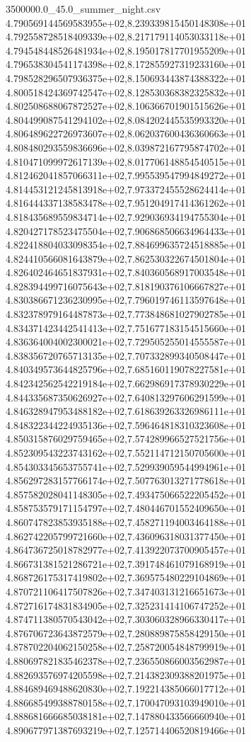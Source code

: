 \begin{filecontents*}{3500000.0_45.0_summer_night.csv}
4.790569144569583955e+02,8.239339815450148308e+01
4.792558728518409339e+02,8.217179114053033118e+01
4.794548448526481934e+02,8.195017817701955209e+01
4.796538304541174398e+02,8.172855927319233160e+01
4.798528296507936375e+02,8.150693443874388322e+01
4.800518424369742547e+02,8.128530368382325832e+01
4.802508688067872527e+02,8.106366701901515626e+01
4.804499087541294102e+02,8.084202445535993320e+01
4.806489622726973607e+02,8.062037600436360663e+01
4.808480293559836696e+02,8.039872167795874702e+01
4.810471099972617139e+02,8.017706148854540515e+01
4.812462041857066311e+02,7.995539547994849272e+01
4.814453121245813918e+02,7.973372455528624414e+01
4.816444337138583478e+02,7.951204917414361262e+01
4.818435689559834714e+02,7.929036934194755304e+01
4.820427178523475504e+02,7.906868506634964433e+01
4.822418804033098354e+02,7.884699635724518885e+01
4.824410566081643879e+02,7.862530322674501804e+01
4.826402464651837931e+02,7.840360568917003548e+01
4.828394499716075643e+02,7.818190376106667827e+01
4.830386671236230995e+02,7.796019746113597648e+01
4.832378979164487873e+02,7.773848681027902785e+01
4.834371423442541413e+02,7.751677183154515660e+01
4.836364004002300021e+02,7.729505255014555587e+01
4.838356720765713135e+02,7.707332899340508447e+01
4.840349573644825796e+02,7.685160119078227581e+01
4.842342562542219184e+02,7.662986917378930229e+01
4.844335687350626927e+02,7.640813297606291599e+01
4.846328947953488182e+02,7.618639263326986111e+01
4.848322344224935136e+02,7.596464818310323608e+01
4.850315876029759465e+02,7.574289966527521756e+01
4.852309543223743162e+02,7.552114712150705600e+01
4.854303345653755741e+02,7.529939059544994961e+01
4.856297283157766174e+02,7.507763013271778618e+01
4.857582028041148305e+02,7.493475066522205452e+01
4.858753579171154797e+02,7.480446701552409650e+01
4.860747823853935188e+02,7.458271194003464188e+01
4.862742205799721660e+02,7.436096318031377450e+01
4.864736725018782977e+02,7.413922073700905457e+01
4.866731381521286721e+02,7.391748461079168919e+01
4.868726175317419802e+02,7.369575480229104869e+01
4.870721106417507826e+02,7.347403131216651673e+01
4.872716174831834905e+02,7.325231414106747252e+01
4.874711380570543042e+02,7.303060328966330417e+01
4.876706723643872579e+02,7.280889875858429150e+01
4.878702204062150258e+02,7.258720054848799919e+01
4.880697821835462378e+02,7.236550866003562987e+01
4.882693576974205598e+02,7.214382309388201975e+01
4.884689469488620830e+02,7.192214385066017712e+01
4.886685499388780158e+02,7.170047093103949010e+01
4.888681666685038181e+02,7.147880433566660940e+01
4.890677971387693219e+02,7.125714406520819466e+01

\end{filecontents*}
